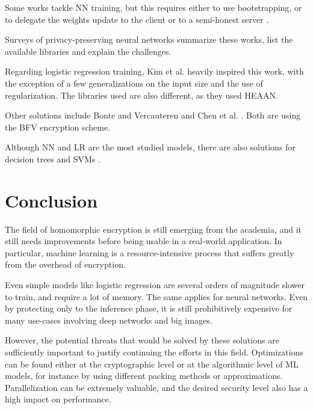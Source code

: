 \documentclass[a4paper,11pt,oneside]{report}
\begin{document}
Some works tackle NN training, but this requires either to use bootstrapping, or to delegate the weights update to the client \cite{mihara_neural_2020} or to a semi-honest server \cite{bellafqira_secure_2018}.

Surveys \cite{pulido-gaytan_privacy-preserving_2021,podschwadt_sok_2022} of privacy-preserving neural networks summarize these works, list the available libraries and explain the challenges.

Regarding logistic regression training, Kim et al. \cite{kim_logistic_2018} heavily inspired this work, with the exception of a few generalizations on the input size and the use of regularization.
The libraries used are also different, as they used HEAAN.

Other solutions include Bonte and Vercauteren \cite{bonte_privacy-preserving_2018} and Chen et al. \cite{chen_logistic_2018}.
Both are using the BFV encryption scheme.

Although NN and LR are the most studied models, there are also solutions for decision trees \cite{akavia_privacy-preserving_2019} and SVMs \cite{park_he-friendly_2020}.


\chapter{Conclusion}


The field of homomorphic encryption is still emerging from the academia, and it still needs improvements before being usable in a real-world application. 
In particular, machine learning is a resource-intensive process that suffers greatly from the overhead of encryption.

Even simple models like logistic regression are several orders of magnitude slower to train, and require a lot of memory. 
The same applies for neural networks. Even by protecting only to the inference phase, it is still prohibitively expensive for many use-cases involving deep networks and big images.

However, the potential threats that would be solved by these solutions are sufficiently important to justify continuing the efforts in this field.
Optimizations can be found either at the cryptographic level or at the algorithmic level of ML models, for instance by using different packing methods or approximations.
Parallelization can be extremely valuable, and the desired security level also has a high impact on performance.
\end{document}
